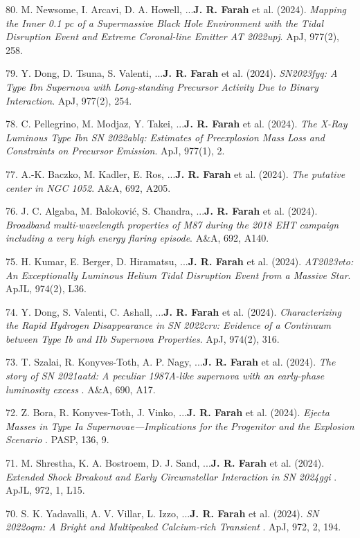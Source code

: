 \documentclass[margin,line]{res}
\begin{document}
\begin{resume}
80. M. Newsome, I. Arcavi, D. A. Howell, ...\textbf{J. R. Farah} et al. (2024). \textit{Mapping the Inner 0.1 pc of a Supermassive Black Hole Environment with the Tidal Disruption Event and Extreme Coronal-line Emitter AT 2022upj}. ApJ, 977(2), 258.

79. Y. Dong, D. Tsuna, S. Valenti, ...\textbf{J. R. Farah} et al. (2024). \textit{SN2023fyq: A Type Ibn Supernova with Long-standing Precursor Activity Due to Binary Interaction}. ApJ, 977(2), 254.

78. C. Pellegrino, M. Modjaz, Y. Takei, ...\textbf{J. R. Farah} et al. (2024). \textit{The X-Ray Luminous Type Ibn SN 2022ablq: Estimates of Preexplosion Mass Loss and Constraints on Precursor Emission}. ApJ, 977(1), 2.

77. A.-K. Baczko, M. Kadler, E. Ros, ...\textbf{J. R. Farah} et al. (2024). \textit{The putative center in NGC 1052}. A&A, 692, A205.

76. J. C. Algaba, M. Baloković, S. Chandra, ...\textbf{J. R. Farah} et al. (2024). \textit{Broadband multi-wavelength properties of M87 during the 2018 EHT campaign including a very high energy flaring episode}. A&A, 692, A140.

75. H. Kumar, E. Berger, D. Hiramatsu, ...\textbf{J. R. Farah} et al. (2024). \textit{AT2023vto: An Exceptionally Luminous Helium Tidal Disruption Event from a Massive Star}. ApJL, 974(2), L36.

74. Y. Dong, S. Valenti, C. Ashall, ...\textbf{J. R. Farah} et al. (2024). \textit{Characterizing the Rapid Hydrogen Disappearance in SN 2022crv: Evidence of a Continuum between Type Ib and IIb Supernova Properties}. ApJ, 974(2), 316.

73. T. Szalai, R. Konyves-Toth, A. P. Nagy, ...\textbf{J. R. Farah} et al. (2024). \textit{ The story of SN 2021aatd: A peculiar 1987A-like supernova with an early-phase luminosity excess }. A\&A, 690, A17.

72. Z. Bora, R. Konyves-Toth, J. Vinko, ...\textbf{J. R. Farah} et al. (2024). \textit{ Ejecta Masses in Type Ia Supernovae—Implications for the Progenitor and the Explosion Scenario }. PASP, 136, 9.

71. M. Shrestha, K. A. Bostroem, D. J. Sand, ...\textbf{J. R. Farah} et al. (2024). \textit{ Extended Shock Breakout and Early Circumstellar Interaction in SN 2024ggi }. ApJL, 972, 1, L15.

70. S. K. Yadavalli, A. V. Villar, L. Izzo, ...\textbf{J. R. Farah} et al. (2024). \textit{ SN 2022oqm: A Bright and Multipeaked Calcium-rich Transient }. ApJ, 972, 2, 194.


\end{resume}
\end{document}
